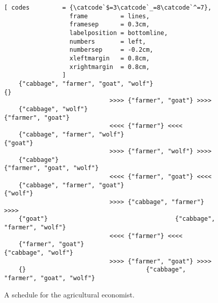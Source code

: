 \begin{figure}[!ht]
  \centering
\begin{Verbatim}[ codes         = {\catcode`$=3\catcode`_=8\catcode`^=7},
                  frame         = lines, 
                  framesep      = 0.3cm, 
                  labelposition = bottomline,
                  numbers       = left,
                  numbersep     = -0.2cm,
                  xleftmargin   = 0.8cm,
                  xrightmargin  = 0.8cm,
                ]
    {"cabbage", "farmer", "goat", "wolf"}                                 {}
                             >>>> {"farmer", "goat"} >>>> 
    {"cabbage", "wolf"}                                   {"farmer", "goat"}
                             <<<< {"farmer"} <<<< 
    {"cabbage", "farmer", "wolf"}                                   {"goat"}
                             >>>> {"farmer", "wolf"} >>>> 
    {"cabbage"}                                   {"farmer", "goat", "wolf"}
                             <<<< {"farmer", "goat"} <<<< 
    {"cabbage", "farmer", "goat"}                                   {"wolf"}
                             >>>> {"cabbage", "farmer"} >>>> 
    {"goat"}                                   {"cabbage", "farmer", "wolf"}
                             <<<< {"farmer"} <<<< 
    {"farmer", "goat"}                                   {"cabbage", "wolf"}
                             >>>> {"farmer", "goat"} >>>> 
    {}                                 {"cabbage", "farmer", "goat", "wolf"}
\end{Verbatim} 
\vspace*{-0.3cm}
\caption{A schedule for the agricultural economist.}  
\label{fig:wolf-ziege-solution}
\end{figure}
\pagebreak
\vspace*{\fill}



